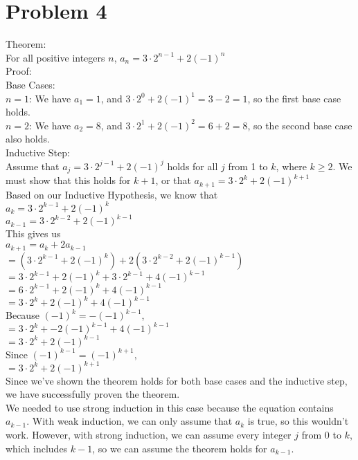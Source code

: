 \documentclass{article}
\begin{document}
\section*{Problem 4}
Theorem:\\
For all positive integers $n$, $a_n=3\cdot 2^{n-1}+2(-1)^n$\\
Proof:\\
Base Cases:\\
$n=1$: We have $a_1=1$, and $3\cdot 2^0+2(-1)^1=3-2=1$, so the first base case holds.\\
$n=2$: We have $a_2=8$, and $3\cdot 2^1+2(-1)^2=6+2=8$, so the second base case also holds.\\
Inductive Step:\\
Assume that $a_j=3\cdot 2^{j-1}+2(-1)^j$ holds for all $j$ from 1 to $k$, where $k\geq 2$. We must show that this holds for $k+1$, or that $a_{k+1}=3\cdot 2^k+2(-1)^{k+1}$\\
Based on our Inductive Hypothesis, we know that\\
$a_k=3\cdot 2^{k-1}+2(-1)^k$\\
$a_{k-1}=3\cdot 2^{k-2}+2(-1)^{k-1}$\\
This gives us\\
$a_{k+1}=a_k+2a_{k-1}$\\
$=(3\cdot 2^{k-1}+2(-1)^k)+2(3\cdot 2^{k-2}+2(-1)^{k-1})$\\
$=3\cdot 2^{k-1}+2(-1)^k+3\cdot 2^{k-1}+4(-1)^{k-1}$\\
$=6\cdot 2^{k-1}+2(-1)^k+4(-1)^{k-1}$\\
$=3\cdot 2^{k}+2(-1)^k+4(-1)^{k-1}$\\
Because $(-1)^k=-(-1)^{k-1}$,\\
$=3\cdot 2^{k}+-2(-1)^{k-1}+4(-1)^{k-1}$\\
$=3\cdot 2^{k}+2(-1)^{k-1}$\\
Since $(-1)^{k-1}=(-1)^{k+1},$\\
$=3\cdot 2^{k}+2(-1)^{k+1}$\\
Since we've shown the theorem holds for both base cases and the inductive step, we have successfully proven the theorem.\\
We needed to use strong induction in this case because the equation contains $a_{k-1}$. With weak induction, we can only assume that $a_k$ is true, so this wouldn't work. However, with strong induction, we can assume every integer $j$ from 0 to $k$, which includes $k-1$, so we can assume the theorem holds for $a_{k-1}$.
\end{document}
